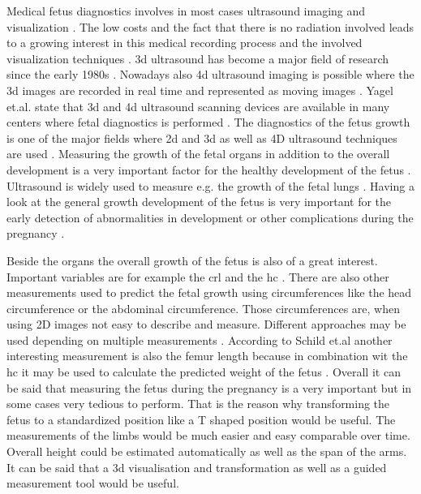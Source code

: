 
Medical fetus diagnostics involves in most cases ultrasound imaging and visualization \cite{Viola2013}. The low costs and the fact that there is no radiation involved leads to a growing interest in this medical recording process and the involved visualization techniques \cite{Huang2017}. \gls{3d} ultrasound has become a major field of research since the early 1980s \cite{Correa2010}. Nowadays also \gls{4d} ultrasound imaging is possible where the \gls{3d} images are recorded in real time and represented as moving images \cite{Yagel2007}. Yagel et.al. state that \gls{3d} and \gls{4d} ultrasound scanning devices are available in many centers where fetal diagnostics is performed \cite{Yagel2007}.  The diagnostics of the fetus growth is one of the major fields where \gls{2d} and \gls{3d} as well as 4D ultrasound techniques are used \cite{Moeglin2005}. Measuring the growth of the fetal organs in addition to the overall development is a very important factor for the healthy development of the fetus \cite{Moeglin2005}. Ultrasound is widely used to measure e.g. the growth of the fetal lungs \cite{Moeglin2005}. Having a look at the general growth development of the fetus is very important for the early detection of abnormalities in development or other complications during the pregnancy \cite{Whitworth2014}.\newline\newline

Beside the organs the overall growth of the fetus is also of a great interest. Important variables are for example the \gls{crl} and the \gls{hc} \cite{Loughna2009}. There are also other measurements used to predict the fetal growth using circumferences like the head circumference or the abdominal circumference. Those circumferences are, when using 2D images not easy to describe and measure. Different approaches may be used depending on multiple measurements \cite{Loughna2009}. According to Schild et.al another interesting measurement is also the femur length because in combination wit the \gls{hc} it may be used to calculate the predicted weight of the fetus \cite{Schild2000FetalUltrasound}. Overall it can be said that measuring the fetus during the pregnancy is a very important but in some cases very tedious to perform. That is the reason why transforming the fetus to a standardized position like a T shaped position would be useful. The measurements of the limbs would be much easier and easy comparable over time. Overall height could be estimated automatically as well as the span of the arms. It can be said that a \gls{3d} visualisation and transformation as well as a guided measurement tool would be useful.

